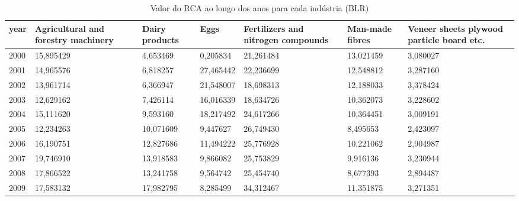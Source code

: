 \begin{table}
\centering
\caption{Valor do RCA ao longo dos anos para cada indústria (BLR)}
\begin{tabular}{p{1cm}p{2cm}p{2cm}p{2cm}p{2cm}p{2cm}p{2cm}}
\toprule
 year &  Agricultural and forestry machinery &  Dairy products &      Eggs &  Fertilizers and nitrogen compounds &  Man-made fibres &  Veneer sheets plywood particle board etc. \\
\midrule
 2000 &                            15,895429 &        4,653469 &  0,205834 &                           21,261484 &        13,021459 &                                   3,080027 \\
 2001 &                            14,965576 &        6,818257 & 27,465442 &                           22,236699 &        12,548812 &                                   3,287160 \\
 2002 &                            13,961714 &        6,366947 & 21,548007 &                           18,698313 &        12,188033 &                                   3,378424 \\
 2003 &                            12,629162 &        7,426114 & 16,016339 &                           18,634726 &        10,362073 &                                   3,228602 \\
 2004 &                            15,111620 &        9,593160 & 18,217492 &                           24,617266 &        10,364451 &                                   3,009191 \\
 2005 &                            12,234263 &       10,071609 &  9,447627 &                           26,749430 &         8,495653 &                                   2,423097 \\
 2006 &                            16,190751 &       12,827686 & 11,494222 &                           25,776928 &        10,221062 &                                   2,904987 \\
 2007 &                            19,746910 &       13,918583 &  9,866082 &                           25,753829 &         9,916136 &                                   3,230944 \\
 2008 &                            17,866522 &       13,241758 &  9,564742 &                           25,454740 &         8,677393 &                                   2,894487 \\
 2009 &                            17,583132 &       17,982795 &  8,285499 &                           34,312467 &        11,351875 &                                   3,271351 \\

\end{tabular}
\end{table}
